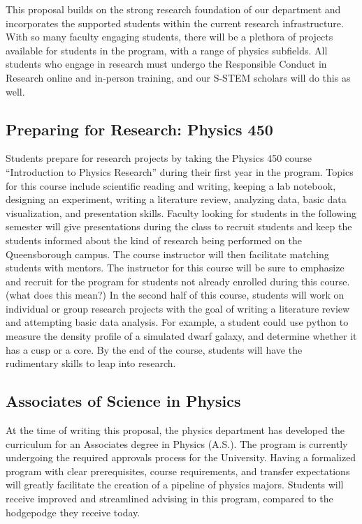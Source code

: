 \documentclass[12pt]{article}
\newcommand\reword[1]{{\color{red}#1}}
\begin{document}
This proposal builds on the strong research foundation of our department and incorporates the supported students within the current research infrastructure.  With so many faculty engaging students, there will be a plethora of projects available for students in the program, with a range of physics subfields.  All students who engage in research must undergo the Responsible Conduct in Research online and in-person training, and our S-STEM scholars will do this as well.

\subsection{Preparing for Research: Physics 450}
Students prepare for research projects by taking the Physics 450 course ``Introduction to Physics Research'' during their first year in the program.   Topics for this course include scientific reading and writing, keeping a lab notebook, designing an experiment, writing a literature review, analyzing data, basic data visualization, and presentation skills.  Faculty looking for students in the following semester will give presentations during the class to recruit students and keep the students informed about the kind of research being performed on the Queensborough campus.  The course instructor will then facilitate matching students with mentors. \reword{ The instructor for this course will be sure to emphasize and recruit for the program for students not already enrolled during this course.  (what does this mean?)}  In the second half of this course, students will work on individual or group research projects with the goal of writing a literature review and attempting basic data analysis.  For example, a student could use python to measure the density profile of a simulated dwarf galaxy, and determine whether it has a cusp or a core.  By the end of the course, students will have the rudimentary skills to leap into research.  

\subsection{Associates of Science in Physics}
At the time of writing this proposal, the physics department has developed the curriculum for an Associates degree in Physics (A.S.).  The program is currently undergoing the required approvals process for the University.  Having a formalized program with clear prerequisites, course requirements, and transfer expectations will greatly facilitate the creation of a pipeline of physics majors.  Students will receive improved and streamlined advising in this program, compared to the hodgepodge they receive today.  
\end{document}
